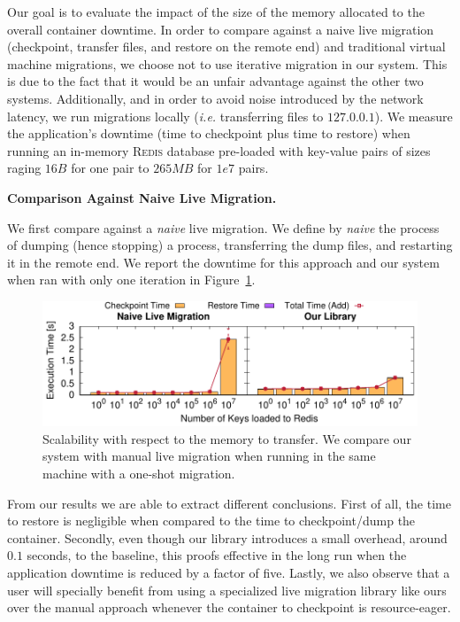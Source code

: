 Our goal is to evaluate the impact of the size of the memory allocated to the overall container downtime.
In order to compare against a naive live migration (checkpoint, transfer files, and restore on the remote end) and traditional virtual machine migrations, we choose not to use iterative migration in our system.
This is due to the fact that it would be an unfair advantage against the other two systems.
Additionally, and in order to avoid noise introduced by the network latency, we run migrations locally (\textit{i.e.} transferring files to $127.0.0.1$).
We measure the application's downtime (time to checkpoint plus time to restore) when running an in-memory \textsc{Redis} database pre-loaded with key-value pairs of sizes raging $16 B$ for one pair to $265 MB$ for $1e7$ pairs.

\textbf{Comparison Against Naive Live Migration.}

We first compare against a \textit{naive} live migration.
We define by \textit{naive} the process of dumping (hence stopping) a process, transferring the dump files, and restarting it in the remote end.
We report the downtime for this approach and our system when ran with only one iteration in Figure~\ref{fig:key-scalability}.
\begin{figure}[h!]
    \centering
    \includegraphics[width=\textwidth]{figs/key-scalability/key_scalability.pdf}
    \caption[Scalability with respect to the memory to transfer.]{Scalability with respect to the memory to transfer. We compare our system with manual live migration when running in the same machine with a one-shot migration.\label{fig:key-scalability}}
\end{figure}

From our results we are able to extract different conclusions.
First of all, the time to restore is negligible when compared to the time to checkpoint/dump the container.
Secondly, even though our library introduces a small overhead, around $0.1$ seconds, to the baseline, this proofs effective in the long run when the application downtime is reduced by a factor of five.
Lastly, we also observe that a user will specially benefit from using a specialized live migration library like ours over the manual approach whenever the container to checkpoint is resource-eager.

